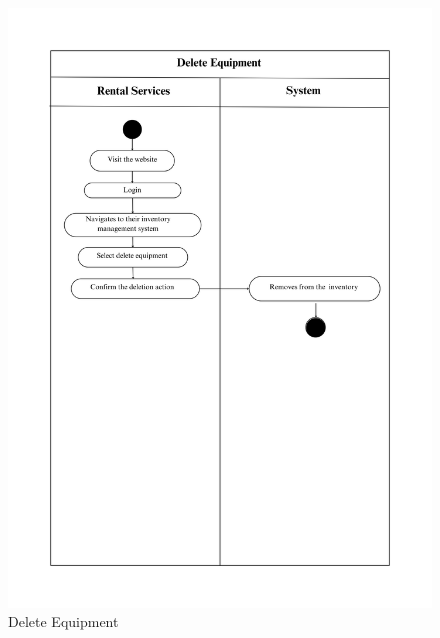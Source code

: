 \begin{figure}[h!]
    \centering
    \includegraphics[width=1\textwidth]{Images/Activity Diagrams/22 Delete Equipment.png}
    \caption{Delete Equipment}
    \label{fig:activity-delete-equ}
\end{figure}


